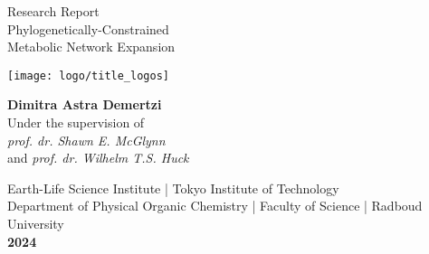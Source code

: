 \begin{titlepage}\label{sec:title}
    \begin{center}
    \thispagestyle{empty}
    
    \Large
    Research Report\\
    \vspace{0.2cm}
    \huge{Phylogenetically-Constrained\\Metabolic Network Expansion}
    

    \texttt{[image: logo/title\_logos]}

    
    \vspace{0.8cm}
    \large\textbf{Dimitra Astra Demertzi}\\
    \vspace{0.2cm}
    \large Under the supervision of\\ \emph{prof. dr. Shawn E. McGlynn}\\ and \emph{prof. dr. Wilhelm T.S. Huck}
    \vspace{3cm}
    

    \normalsize
    Earth-Life Science Institute | Tokyo Institute of Technology
    \\
    Department of Physical Organic Chemistry |  Faculty of Science | Radboud University
    \\
    \normalsize\textbf{2024}
    
    \vfill
    \end{center}
    \end{titlepage}